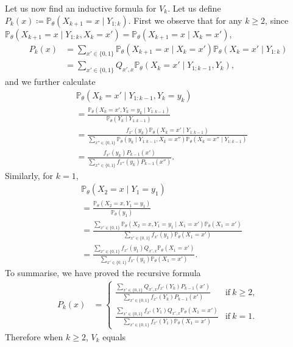 \documentclass[journal]{IEEEtran}
\newcommand{\1}{\boldsymbol{1}}
\newcommand{\PP}{\mathbb{P}}
\begin{document}
  Let us now find an inductive formula for $V_k$. Let us define $P_k(x) \coloneqq \PP_{\theta}(X_{k+1} = x \mid Y_{1:k})$. First we observe that for any $k \geq 2$, since $\PP_{\theta}(X_{k+1} = x \mid Y_{1:k},X_k = x') = \PP_{\theta}(X_{k+1} = x \mid X_k = x')$,
  \begin{align*}
    P_k(x)
	&= \sum_{x' \in \{0,1\}} \PP_{\theta}(X_{k+1} = x \mid X_k = x')\PP_{\theta}(X_k = x' \mid Y_{1:k})\\
	&= \sum_{x' \in \{0,1\}} Q_{x',x}\PP_{\theta}(X_k = x' \mid Y_{1:k-1},Y_k),
  \end{align*}
  and we further calculate
  \begin{align*}
	&\PP_{\theta}(X_k = x' \mid Y_{1:k-1},Y_k = y_k)\\%
	&= \frac{\PP_{\theta}(X_k=x',Y_k = y_k \mid Y_{1:k-1})}{\PP_{\theta}(Y_k \mid Y_{1:k-1})}\\
	&= \frac{f_{x'}(y_k)\PP_{\theta}(X_k = x' \mid Y_{1:k-1})}{ \sum_{x'' \in \{0,1\}}\PP_{\theta}(y_k \mid Y_{1:k-1},X_{k} = x'')\PP_{\theta}(X_k = x'' \mid Y_{1:k-1}) }\\
	&= \frac{f_{x'}(y_k)P_{k-1}(x')}{\sum_{x'' \in \{0,1\}}f_{x''}(y_k)P_{k-1}(x'')  }.
  \end{align*}
  Similarly, for $k=1$,
  \begin{align*}
	&\PP_{\theta}(X_2 = x \mid Y_1 = y_1)\\%
	&= \frac{\PP_{\theta}(X_2 = x, Y_1=y_1)}{\PP_{\theta}(y_1)}\\
	&= \frac{\sum_{x' \in \{0,1\}}\PP_{\theta}(X_2 = x, Y_1 = y_1 \mid X_1 = x')\PP_{\theta}(X_1 = x') }{\sum_{x'\in \{0,1\}}f_{x'}(y_1)\PP_{\theta}(X_1=x') }\\
	&= \frac{\sum_{x' \in \{0,1\}} f_{x'}(y_1) Q_{x',x} \PP_{\theta}(X_1 = x') }{\sum_{x'\in \{0,1\}}f_{x'}(y_1)\PP_{\theta}(X_1=x')}.
  \end{align*}
  To summarise, we have proved the recursive formula %
  \begin{align*}
	P_k(x)%
	&=
   \begin{cases}
	 \frac{\sum_{x' \in \{0,1\}} Q_{x',x} f_{x'}(Y_k)P_{k-1}(x')}{\sum_{x' \in \{0,1\}} f_{x'}(Y_k)P_{k-1}(x')} &\mathrm{if}\ k \geq 2,\\
	 \frac{\sum_{x' \in \{0,1\}} f_{x'}(Y_1) Q_{x',x} \PP_{\theta}(X_1 = x') }{\sum_{x'\in \{0,1\}}f_{x'}(Y_1)\PP_{\theta}(X_1=x')} &\mathrm{if}\ k=1.
   \end{cases}
  \end{align*}
  Therefore when $k \geq 2$, $V_k$ equals
\end{document}
